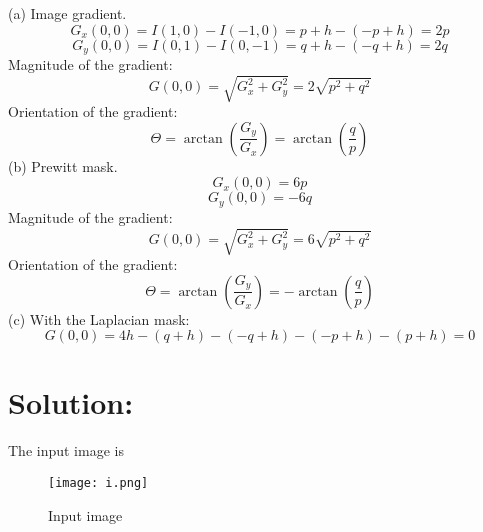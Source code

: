 \documentclass[12pt]{article}
\begin{document}
\noindent (a) Image gradient.
\begin{equation*}
G_x(0, 0) = I(1,0) - I(-1,0) = p+h-(-p+h) = 2p
\end{equation*}
\begin{equation*}
G_y(0, 0) = I(0,1) - I(0,-1) = q+h-(-q+h) = 2q
\end{equation*}
Magnitude of the gradient:
\begin{equation*}
G(0,0) = \sqrt{G_x^2 + G_y^2} = 2\sqrt{p^2+q^2}
\end{equation*}
Orientation of the gradient:
\begin{equation*}
\Theta = \arctan(\frac{G_y}{G_x}) = \arctan(\frac{q}{p})
\end{equation*}
(b) Prewitt mask.
\begin{equation*}
G_x(0, 0) = 6p
\end{equation*}
\begin{equation*}
G_y(0, 0) = -6q
\end{equation*}
Magnitude of the gradient:
\begin{equation*}
G(0,0) = \sqrt{G_x^2 + G_y^2} = 6\sqrt{p^2+q^2}
\end{equation*}
Orientation of the gradient:
\begin{equation*}
\Theta = \arctan(\frac{G_y}{G_x}) = -\arctan(\frac{q}{p})
\end{equation*}
(c) With the Laplacian mask:
\begin{equation*}
G(0,0) = 4h-(q+h)-(-q+h)-(-p+h)-(p+h)=0
\end{equation*}
\section{Solution:}
The input image is 
\begin{figure}[H]
\centering
\texttt{[image: i.png]}
\caption{Input image}
\label{i}
\end{figure}
\end{document}
